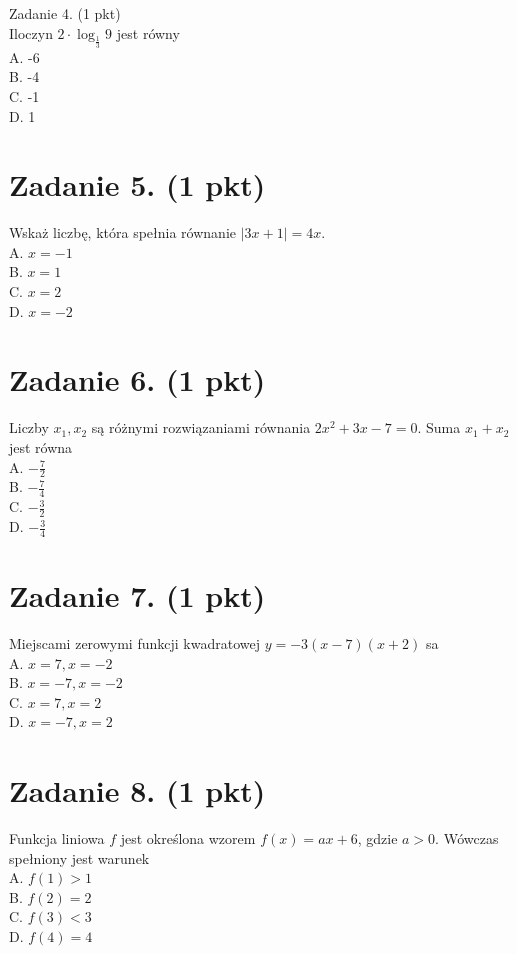 \documentclass[10pt]{article}
\begin{document}
Zadanie 4. (1 pkt)\\
Iloczyn \(2 \cdot \log _{\frac{1}{3}} 9\) jest równy\\
A. -6\\
B. -4\\
C. -1\\
D. 1

\section*{Zadanie 5. (1 pkt)}
Wskaż liczbę, która spełnia równanie \(|3 x+1|=4 x\).\\
A. \(x=-1\)\\
B. \(x=1\)\\
C. \(x=2\)\\
D. \(x=-2\)

\section*{Zadanie 6. (1 pkt)}
Liczby \(x_{1}, x_{2}\) są różnymi rozwiązaniami równania \(2 x^{2}+3 x-7=0\). Suma \(x_{1}+x_{2}\) jest równa\\
A. \(-\frac{7}{2}\)\\
B. \(-\frac{7}{4}\)\\
C. \(-\frac{3}{2}\)\\
D. \(-\frac{3}{4}\)

\section*{Zadanie 7. (1 pkt)}
Miejscami zerowymi funkcji kwadratowej \(y=-3(x-7)(x+2)\) sa\\
A. \(x=7, x=-2\)\\
B. \(x=-7, x=-2\)\\
C. \(x=7, x=2\)\\
D. \(x=-7, x=2\)

\section*{Zadanie 8. (1 pkt)}
Funkcja liniowa \(f\) jest określona wzorem \(f(x)=a x+6\), gdzie \(a>0\). Wówczas spełniony jest warunek\\
A. \(f(1)>1\)\\
B. \(f(2)=2\)\\
C. \(f(3)<3\)\\
D. \(f(4)=4\)
\end{document}
